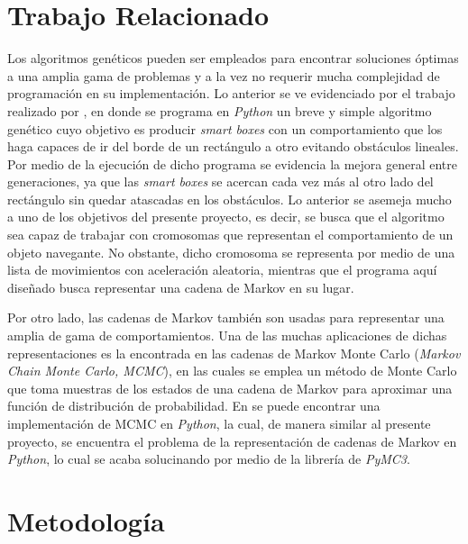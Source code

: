 \documentclass[conference]{IEEEtran}
\begin{document}
\section{Trabajo Relacionado}
Los algoritmos genéticos pueden ser empleados para encontrar soluciones óptimas a una amplia gama de problemas y a la vez no requerir mucha complejidad de programación en su implementación. Lo anterior se ve evidenciado por el trabajo realizado por \cite{b3}, en donde se programa en \textit{Python} un breve y simple algoritmo genético cuyo objetivo es producir \textit{smart boxes} con un comportamiento que los haga capaces de ir del borde de un rectángulo a otro evitando obstáculos lineales. Por medio de la ejecución de dicho programa se evidencia la mejora general entre generaciones, ya que las \textit{smart boxes} se acercan cada vez más al otro lado del rectángulo sin quedar atascadas en los obstáculos. Lo anterior se asemeja mucho a uno de los objetivos del presente proyecto, es decir, se busca que el algoritmo sea capaz de trabajar con cromosomas que representan el comportamiento de un objeto navegante. No obstante, dicho cromosoma se representa por medio de una lista de movimientos con aceleración aleatoria, mientras que el programa aquí diseñado busca representar una cadena de Markov en su lugar.

Por otro lado, las cadenas de Markov también son usadas para representar una amplia de gama de comportamientos. Una de las muchas aplicaciones de dichas representaciones es la encontrada en las cadenas de Markov Monte Carlo (\textit{Markov Chain Monte Carlo, MCMC}), en las cuales se emplea un método de Monte Carlo que toma muestras de los estados de una cadena de Markov para aproximar una función de distribución de probabilidad. En \cite{b4} se puede encontrar una implementación de MCMC en \textit{Python}, la cual, de manera similar al presente proyecto, se encuentra el problema de la representación de cadenas de Markov en \textit{Python}, lo cual se acaba solucinando por medio de la librería de  \textit{PyMC3}.  

\section{Metodología}
\end{document}

